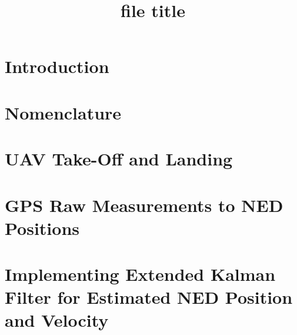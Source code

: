 \documentclass{rapport}
\title{file title} %
\begin{document}

\subject{EE5114: Autonomous Robot Navigation} %



        
\buildmargins %
\buildcover %


\section{Introduction}
\label{Introduction}



\section{Nomenclature}
\label{Nomenclature}


\section{UAV Take-Off and Landing}
\label{Initial UAV Analysis}



\section{GPS Raw Measurements to NED Positions}
\label{GPStoNED}


\section{Implementing Extended Kalman Filter for Estimated NED Position and Velocity}
\label{EKF}

\end{document}
